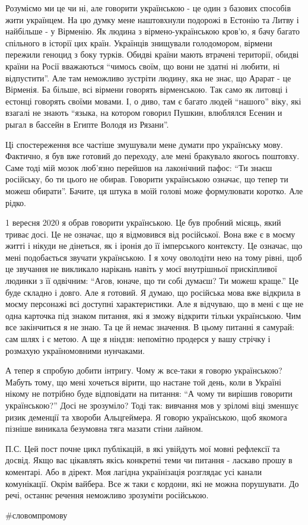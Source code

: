 Розуміємо ми це чи ні, але говорити українською - це один з базових способів
жити українцем. На цю думку мене наштовхнули подорожі в Естонію та Литву і
найбільше - у Вірменію. Як людина з вірмено-українською кров’ю, я бачу багато
спільного в історії цих країн. Українців знищували голодомором, вірмени
пережили геноцид з боку турків. Обидві країни мають втрачені території, обидві
країни на Росії вважаються \enquote{чимось своїм, що вони не здатні ні любити, ні
відпустити}. Але там неможливо зустріти людину, яка не знає, що Арарат - це
Вірменія. Ба більше, всі вірмени говорять вірменською. Так само як литовці і
естонці говорять своїми мовами. І, о диво, там є багато людей \enquote{нашого} віку,
які взагалі не знають \enquote{языка, на котором говорил Пушкин, влюблялся Есенин и
рыгал в бассейн в Египте Володя из Рязани}.

Ці спостереження все частіше змушували мене думати про українську мову.
Фактично, я був вже готовий до переходу, але мені бракувало якогось поштовху.
Саме тоді мій мозок люб’язно перейшов на лаконічний пафос: \enquote{Ти знаєш російську,
бо ти цього не обирав. Говорити українською означає, що тепер ти можеш
обирати}. Бачите, ця штука в моїй голові може формулювати коротко. Але рідко.

1 вересня 2020 я обрав говорити українською. Це був пробний місяць, який триває
досі. Це не означає, що я відмовився від російської. Вона вже є в моєму житті і
нікуди не дінеться, як і іронія до її імперського контексту. Це означає, що
мені подобається звучати українською. І я хочу оволодіти нею на тому рівні, щоб
це звучання не викликало нарікань навіть у моєї внутрішньої прискіпливої
людинки з її одвічним: \enquote{Агов, юначе, що ти собі думаєш? Ти можеш краще.} Це
буде складно і довго. Але я готовий. Я думаю, що російська мова вже відкрила в
моєму персонажі всі доступні характеристики. Але я відчуваю, що в мені є ще не
одна карточка під знаком питання, які я зможу відкрити тільки українською. Чим
все закінчиться я не знаю. Та це й немає значення. В цьому питанні я самурай:
сам шлях і є метою. А ще я ніндзя: непомітно продерся у вашу стрічку і розмахую
україномовними нунчаками.

А тепер я спробую добити інтригу. Чому ж все-таки я говорю українською? Мабуть
тому, що мені хочеться вірити, що настане той день, коли в Україні нікому не
потрібно буде відповідати на питання: \enquote{А чому ти вирішив говорити українською?}
Досі не зрозуміло? Тоді так: вивчання мов у зріломі віці зменшує ризик деменції
та хвороби Альцгеймера. Я говорю українською, щоб якомога пізніше виникала
безумовна тяга мазати стіни лайном.

П.С. Цей пост почне цикл публікацій, в які увійдуть мої мовні рефлексії та
досвід. Якщо вас цікавлять якісь конкретні теми чи питання - ласкаво прошу в
коментарі. Або в дірект. Моя лагідна українізація розглядає усі канали
комунікації. Окрім вайбера. Все ж таки є кордони, які не можна порушувати. До
речі, останнє речення неможливо зрозуміти російською.

\#словомпромову
